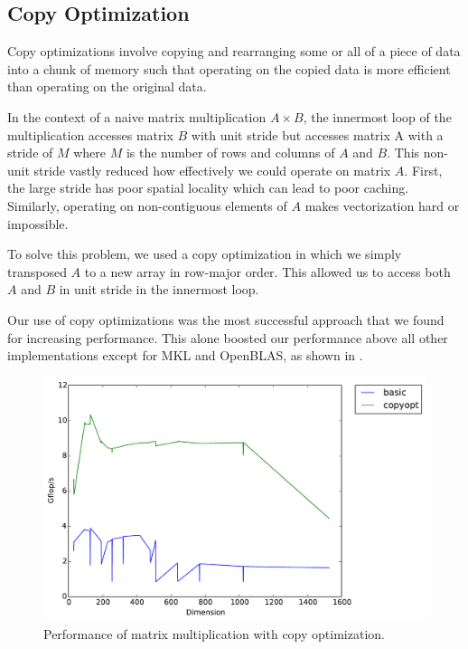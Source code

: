 \subsection{Copy Optimization}
Copy optimizations involve copying and rearranging some or all of a piece of
data into a chunk of memory such that operating on the copied data is more
efficient than operating on the original data.

In the context of a naive matrix multiplication $A \times B$, the innermost
loop of the multiplication accesses matrix $B$ with unit stride but accesses
matrix A with a stride of $M$ where $M$ is the number of rows and columns of
$A$ and $B$. This non-unit stride vastly reduced how effectively we could
operate on matrix $A$. First, the large stride has poor spatial locality which
can lead to poor caching. Similarly, operating on non-contiguous elements of
$A$ makes vectorization hard or impossible.

To solve this problem, we used a copy optimization in which we simply
transposed $A$ to a new array in row-major order. This allowed us to access
both $A$ and $B$ in unit stride in the innermost loop.

Our use of copy optimizations was the most successful approach that we found
for increasing performance. This alone boosted our performance above all other
implementations except for MKL and OpenBLAS, as shown in .

\begin{figure}[h]
  \centering
  \includegraphics[width=\textwidth]{img/timing_copyopt.pdf}
  \caption{Performance of matrix multiplication with copy optimization.}
  \label{fig:copy}
\end{figure}
